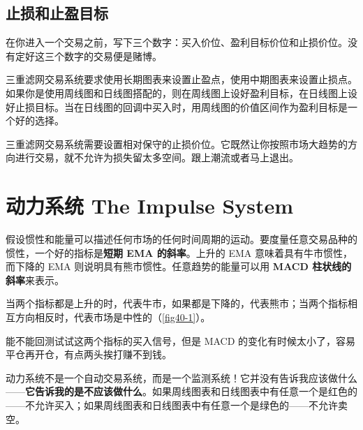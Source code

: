 \subsection*{止损和止盈目标}
在你进入一个交易之前，写下三个数字：买入价位、盈利目标价位和止损价位。没有定好这三个数字的交易便是赌博。

三重滤网交易系统要求使用长期图表来设置止盈点，使用中期图表来设置止损点。如果你是使用周线图和日线图搭配的，则在周线图上设好盈利目标，在日线图上设好止损目标。当在日线图的回调中买入时，用周线图的价值区间作为盈利目标是一个好的选择。

三重滤网交易系统需要设置相对保守的止损价位。它既然让你按照市场大趋势的方向进行交易，就不允许为损失留太多空间。跟上潮流或者马上退出。
\section{动力系统 The Impulse System}
假设惯性和能量可以描述任何市场的任何时间周期的运动。要度量任意交易品种的惯性，一个好的指标是\textbf{短期 EMA 的斜率}。上升的 EMA 意味着具有牛市惯性，而下降的 EMA 则说明具有熊市惯性。任意趋势的能量可以用 \textbf{MACD 柱状线的斜率}来表示。

当两个指标都是上升的时，代表牛市，如果都是下降的，代表熊市；当两个指标相互方向相反时，代表市场是中性的（\autoref{fig40-1}）。

\begin{tcolorbox}
    能不能回测试试这两个指标的买入信号，但是 MACD 的变化有时候太小了，容易平仓再开仓，有点两头挨打赚不到钱。
\end{tcolorbox}

动力系统不是一个自动交易系统，而是一个监测系统！它并没有告诉我应该做什么——\textbf{它告诉我的是不应该做什么}。如果周线图表和日线图表中有任意一个是红色的——不允许买入；如果周线图表和日线图表中有任意一个是绿色的——不允许卖空。



